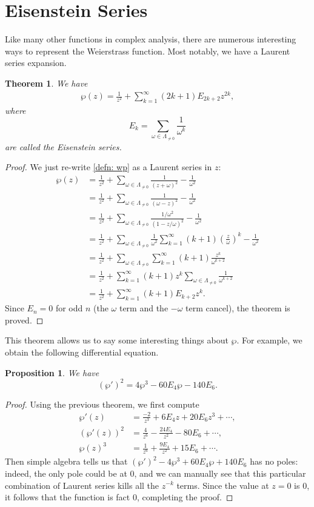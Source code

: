 \documentclass[12pt,reqno]{amsart}
\theoremstyle{plain}
\newtheorem{prop}[thm]{Proposition}
\numberwithin{equation}{section}
\newtheorem{theorem}{Theorem}[section]
\begin{document}
\section{Eisenstein Series}
Like many other functions in complex analysis, there are numerous interesting ways to represent the Weierstrass function. Most notably, we have a Laurent series expansion.
\begin{theorem}
    We have
    \begin{align*}
        \wp(z) = \frac{1}{z^2}+\sum_{k=1}^\infty(2k+1)E_{2k+2}z^{2k},
    \end{align*}
    where
    \[E_k = \sum_{\omega\in \Lambda_{\ne 0}}\frac{1}{\omega^k}\]
    are called the \emph{Eisenstein series}.
\end{theorem}
\begin{proof}
    We just re-write \cref{defn: wp} as a Laurent series in $z$:
    \begin{align*}
        \wp(z) &= \frac{1}{z^2}+\sum_{\omega\in \Lambda_{\ne 0}} \frac{1}{(z+\omega)^2}-\frac{1}{\omega^2}\\
        &= \frac{1}{z^2}+\sum_{\omega\in \Lambda_{\ne 0}}\frac{1}{(\omega-z)^2}-\frac{1}{\omega^2}\\
        &= \frac{1}{z^2}+\sum_{\omega\in \Lambda_{\ne 0}}\frac{1/\omega^2}{(1-z/\omega)^2}-\frac{1}{\omega^2}\\
        &= \frac{1}{z^2}+\sum_{\omega\in \Lambda_{\ne 0}}\frac{1}{\omega^2}\sum_{k=1}^\infty(k+1) \left(\frac{z}{\omega}\right)^{k }- \frac{1}{\omega^2}\\
        &= \frac{1}{z^2} + \sum_{\omega\in \Lambda_{\ne 0}}\sum_{k=1}^\infty (k+1)\frac{z^k}{\omega^{k+2}}\\
        &= \frac{1}{z^2} + \sum_{k=1}^\infty(k+1)z^k\sum_{\omega\in \Lambda_{\ne 0}} \frac{1}{\omega^{k+2}}\\
        &= \frac{1}{z^2} + \sum_{k=1}^\infty(k+1)E_{k+2}z^k.
    \end{align*}
    Since $E_{n}=0$ for odd $n$ (the $\omega$ term and the $-\omega$ term cancel), the theorem is proved.
\end{proof}
This theorem allows us to say some interesting things about $\wp$. For example, we  obtain the following differential equation.
\begin{prop}
    We have
    \[(\wp')^2 = 4\wp^3 - 60 E_4 \wp - 140E_6.\]
\end{prop}
\begin{proof}
    Using the previous theorem, we first compute
    \begin{align*}
            \wp ' (z) &= \frac{-2}{z^3} + 6E_4z + 20E_6z^3 + \cdots,\\
            (\wp ' (z))^2 &= \frac{4}{z^6} - \frac{24E_4}{z^2} -80E_6 + \cdots,\\
            \wp(z)^3 &= \frac{1}{z^6} + \frac{9E_4}{z^2} + 15E_6 + \cdots.
    \end{align*}
    Then simple algebra tells us that $(\wp')^2 -4\wp^3 +60 E_4 \wp +140E_6$ has no poles: indeed, the only pole could be at $0$, and we can manually see that this particular combination of Laurent series kills all the $z^{-k}$ terms. Since the value at $z = 0$ is $0$, it follows that the function is fact $0$, completing the proof.
\end{proof}
\end{document}
